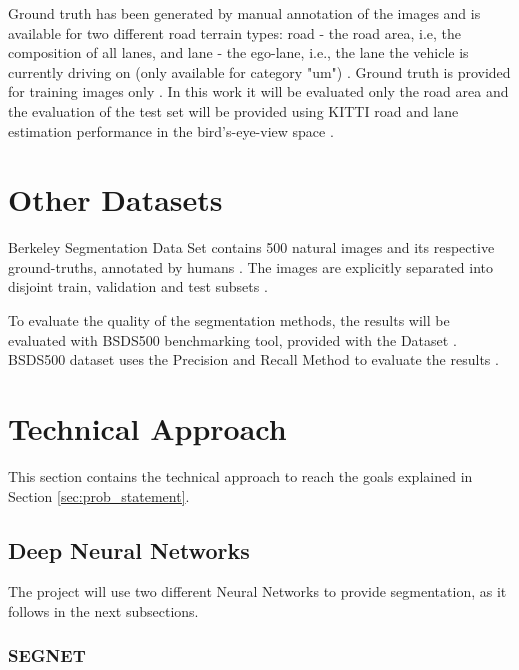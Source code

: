 \documentclass[10pt,twocolumn,letterpaper]{article}
\begin{document}
Ground truth has been generated by manual annotation of the images and is available for two different road terrain types: road - the road area, i.e, the composition of all lanes, and lane - the ego-lane, i.e., the lane the vehicle is currently driving on (only available for category "um") \cite{KITTI}. Ground truth is provided for training images only \cite{KITTI}. In this work it will be evaluated only the road area and the evaluation of the test set will be provided using KITTI road and lane estimation performance in the bird's-eye-view space \cite{KITTI}.

\section{Other Datasets} \label{sec:other_datasets}

Berkeley Segmentation Data Set contains 500 natural images and its respective ground-truths, annotated by humans \cite{BSDS500}. The images are explicitly separated into disjoint train, validation and test subsets \cite{BSDS500}.

To evaluate the quality of the segmentation methods, the results will be evaluated with BSDS500 benchmarking tool, provided with the Dataset \cite{BSDS500}. BSDS500 dataset uses the Precision and Recall Method to evaluate the results \cite{BSDS500}.

\section{Technical Approach} \label{sec:tech_approach}


This section contains the technical approach to reach the goals explained in Section \ref{sec:prob_statement}.

\subsection{Deep Neural Networks} \label{ssec:neura_nets}

The project will use two different Neural Networks to provide segmentation, as it follows in the next subsections.

\subsubsection{SEGNET} \label{sssec:segnet}
\end{document}
